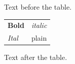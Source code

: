 \documentclass[12pt]{article}
\begin{document}
Text before the table.

\begin{tabular}{ll}\textbf{Bold} & \emph{italic}\\\textit{Ital} & plain\end{tabular}

Text after the table.
\end{document}
